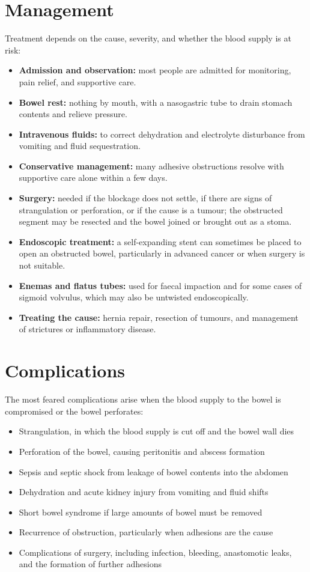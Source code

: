 \section*{Management}
Treatment depends on the cause, severity, and whether the blood supply is at risk:
\begin{itemize}
    \item \textbf{Admission and observation:} most people are admitted for monitoring, pain relief, and supportive care.
    \item \textbf{Bowel rest:} nothing by mouth, with a nasogastric tube to drain stomach contents and relieve pressure.
    \item \textbf{Intravenous fluids:} to correct dehydration and electrolyte disturbance from vomiting and fluid sequestration.
    \item \textbf{Conservative management:} many adhesive obstructions resolve with supportive care alone within a few days.
    \item \textbf{Surgery:} needed if the blockage does not settle, if there are signs of strangulation or perforation, or if the cause is a tumour; the obstructed segment may be resected and the bowel joined or brought out as a stoma.
    \item \textbf{Endoscopic treatment:} a self-expanding stent can sometimes be placed to open an obstructed bowel, particularly in advanced cancer or when surgery is not suitable.
    \item \textbf{Enemas and flatus tubes:} used for faecal impaction and for some cases of sigmoid volvulus, which may also be untwisted endoscopically.
    \item \textbf{Treating the cause:} hernia repair, resection of tumours, and management of strictures or inflammatory disease.
\end{itemize}

\section*{Complications}
The most feared complications arise when the blood supply to the bowel is compromised or the bowel perforates:
\begin{itemize}
    \item Strangulation, in which the blood supply is cut off and the bowel wall dies
    \item Perforation of the bowel, causing peritonitis and abscess formation
    \item Sepsis and septic shock from leakage of bowel contents into the abdomen
    \item Dehydration and acute kidney injury from vomiting and fluid shifts
    \item Short bowel syndrome if large amounts of bowel must be removed
    \item Recurrence of obstruction, particularly when adhesions are the cause
    \item Complications of surgery, including infection, bleeding, anastomotic leaks, and the formation of further adhesions
\end{itemize}

